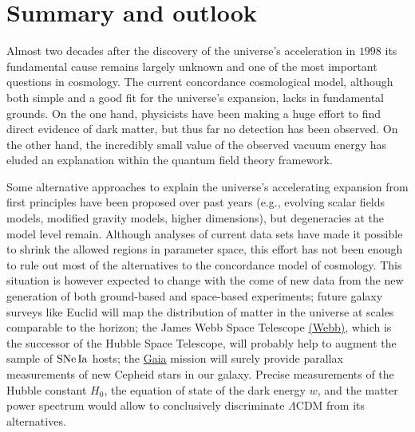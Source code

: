 \chapter{Summary and outlook}
\label{chapter-outlook}

Almost two decades after the discovery of the universe's acceleration in $1998$ its fundamental cause remains largely unknown and one of the most important questions in cosmology. The current concordance cosmological model, although both simple and a good fit for the universe's expansion, lacks in fundamental grounds. On the one hand, physicists have been making a huge effort to find direct evidence of dark matter, but thus far no detection has been observed. On the other hand, the incredibly small value of the observed vacuum energy has eluded an explanation within the quantum field theory framework. 

Some alternative approaches to explain the universe's accelerating expansion from first principles have been proposed over past years (e.g., evolving scalar fields models, modified gravity models, higher dimensions), but degeneracies at the model level remain. Although analyses of current data sets have made it possible to shrink the allowed regions in parameter space, this effort has not been enough to rule out most of the alternatives to the concordance model of cosmology. This situation is however expected to change with the come of new data from the new generation of both ground-based and space-based experiments; future galaxy surveys like Euclid will map the distribution of matter in the universe at scales comparable to the horizon; the James Webb Space Telescope \href{www.jwst.nasa.gov}{(Webb)}, which is the successor of the Hubble Space Telescope, will probably help to augment the sample of $\mathrm{SNe\,Ia}$ hosts; the \href{http://sci.esa.int/gaia/}{Gaia} mission will surely provide parallax measurements of new Cepheid stars in our galaxy. Precise measurements of the Hubble constant $H_0$, the equation of state of the dark energy $w$, and the matter power spectrum would allow to conclusively discriminate $\Lambda$CDM from its alternatives. 

